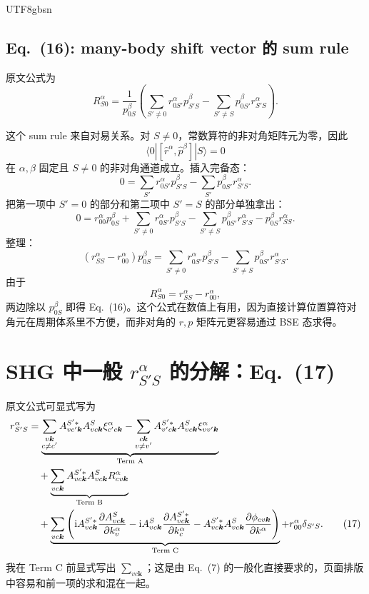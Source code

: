 \documentclass[11pt,a4paper]{article}
\newcommand{\ii}{\mathrm{i}}
\begin{document}
\begin{CJK}{UTF8}{gbsn}
\subsection*{Eq.~(16): many-body shift vector 的 sum rule}

原文公式为
\begin{equation}
R^\alpha_{S0}
=\frac{1}{p^\beta_{0S}}
\left(
\sum_{S'\ne0}r^\alpha_{0S'}p^\beta_{S'S}
-
\sum_{S'\ne S}p^\beta_{0S'}r^\alpha_{S'S}
\right).
\tag{16}
\end{equation}

这个 sum rule 来自对易关系。对 $S\ne0$，常数算符的非对角矩阵元为零，因此
\[
\langle0|[\hat r^\alpha,\hat p^\beta]|S\rangle=0
\]
在 $\alpha,\beta$ 固定且 $S\ne0$ 的非对角通道成立。插入完备态：
\[
0
=\sum_{S'}r^\alpha_{0S'}p^\beta_{S'S}
-\sum_{S'}p^\beta_{0S'}r^\alpha_{S'S}.
\]
把第一项中 $S'=0$ 的部分和第二项中 $S'=S$ 的部分单独拿出：
\[
0
=r^\alpha_{00}p^\beta_{0S}
+\sum_{S'\ne0}r^\alpha_{0S'}p^\beta_{S'S}
-\sum_{S'\ne S}p^\beta_{0S'}r^\alpha_{S'S}
-p^\beta_{0S}r^\alpha_{SS}.
\]
整理：
\[
(r^\alpha_{SS}-r^\alpha_{00})p^\beta_{0S}
=
\sum_{S'\ne0}r^\alpha_{0S'}p^\beta_{S'S}
-
\sum_{S'\ne S}p^\beta_{0S'}r^\alpha_{S'S}.
\]
由于
\[
R^\alpha_{S0}=r^\alpha_{SS}-r^\alpha_{00},
\]
两边除以 $p^\beta_{0S}$ 即得 Eq.~(16)。这个公式在数值上有用，因为直接计算位置算符对角元在周期体系里不方便，而非对角的 $r,p$ 矩阵元更容易通过 BSE 态求得。

\section{SHG 中一般 $r^\alpha_{S'S}$ 的分解：Eq.~(17)}

原文公式可显式写为
\begin{align}
r^\alpha_{S'S}
&=
\underbrace{
\sum_{\substack{v\bm k\\c\ne c'}}
A^{S'*}_{vc'\bm k}A^S_{vc\bm k}\xi^\alpha_{c'c\bm k}
-
\sum_{\substack{c\bm k\\v\ne v'}}
A^{S'*}_{v'c\bm k}A^S_{vc\bm k}\xi^\alpha_{vv'\bm k}
}_{\text{Term A}}
\notag\\
&\quad+
\underbrace{
\sum_{vc\bm k}
A^{S'*}_{vc\bm k}A^S_{vc\bm k}
R^\alpha_{cv\bm k}
}_{\text{Term B}}
\notag\\
&\quad+
\underbrace{
\sum_{vc\bm k}
\left(
\ii A^{S'*}_{vc\bm k}
\frac{\partial A^S_{vc\bm k}}{\partial k^\alpha_v}
-\ii A^S_{vc\bm k}
\frac{\partial A^{S'*}_{vc\bm k}}{\partial k^\alpha_c}
-A^{S'*}_{vc\bm k}A^S_{vc\bm k}
\frac{\partial\phi_{cv\bm k}}{\partial k^\alpha}
\right)
}_{\text{Term C}}
+r^\alpha_{00}\delta_{S'S}.
\tag{17}
\end{align}
我在 Term C 前显式写出 $\sum_{vc\bm k}$；这是由 Eq.~(7) 的一般化直接要求的，页面排版中容易和前一项的求和混在一起。


\end{CJK}
\end{document}
